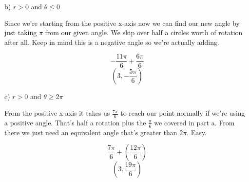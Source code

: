 \begin{solution}
    b) $r > 0$ and $\theta \leq 0$ \medskip
    
        Since we're starting from the positive x-axis now we can find our new angle by just taking $\pi$ from our given angle. We skip over half a circles worth of rotation after all. Keep in mind this is a negative angle so we're actually adding. 
        
        \[-\frac{11\pi}{6} + \frac{6\pi}{6}\]
        \[\boxed{\left( 3, -\frac{5\pi}{6} \right)}\]
        
    c) $r > 0$ and $\theta \geq 2\pi$ \medskip
        
        From the positive x-axis it takes us $\frac{7\pi}{6}$ to reach our point normally if we're using a positive angle. That's half a rotation plus the $\frac{\pi}{6}$ we covered in part a. From there we just need an equivalent angle that's greater than $2\pi$. Easy.
        
        \[\frac{7\pi}{6} + \left( \frac{12\pi}{6} \right)\]
        \[\boxed{ \left( 3, \frac{19\pi}{6} \right)  }\]
\end{solution}        
